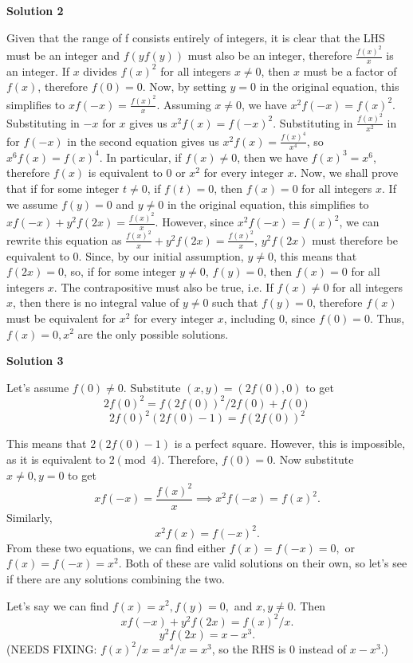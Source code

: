 \begin{enumerate}
 



\textbf{Solution 2}

Given that the range of f consists entirely of integers, it is clear that the LHS must be an integer and $f(yf(y))$ must also be an integer, therefore $\frac{f(x)^2}{x}$ is an integer. If $x$ divides $f(x)^2$ for all integers $x \ne 0$, then $x$ must be a factor of $f(x)$, therefore $f(0)=0$. Now, by setting $y=0$ in the original equation, this simplifies to $xf(-x)=\frac{f(x)^2}{x}$. Assuming $x \ne 0$, we have $x^2f(-x)=f(x)^2$. Substituting in $-x$ for $x$ gives us $x^2f(x)=f(-x)^2$. Substituting in $\frac{f(x)^2}{x^2}$ in for $f(-x)$ in the second equation gives us $x^2f(x)=\frac{f(x)^4}{x^4}$, so $x^6f(x)=f(x)^4$. In particular, if $f(x) \ne 0$, then we have $f(x)^3=x^6$, therefore $f(x)$ is equivalent to $0$ or $x^2$ for every integer $x$. Now, we shall prove that if for some integer $t \ne 0$, if $f(t)=0$, then $f(x)=0$ for all integers $x$. If we assume $f(y)=0$ and $y \ne 0$ in the original equation, this simplifies to $xf(-x)+y^2f(2x)=\frac{f(x)^2}{x}$. However, since $x^2f(-x)=f(x)^2$, we can rewrite this equation as $\frac{f(x)^2}{x}+y^2f(2x)=\frac{f(x)^2}{x}$, $y^2f(2x)$ must therefore be equivalent to $0$. Since, by our initial assumption, $y \ne 0$, this means that $f(2x)=0$, so, if for some integer $y \ne 0$, $f(y)=0$, then $f(x)=0$ for all integers $x$. The contrapositive must also be true, i.e. If $f(x) \ne 0$ for all integers $x$, then there is no integral value of $y \ne 0$ such that $f(y)=0$, therefore $f(x)$ must be equivalent for $x^2$ for every integer $x$, including $0$, since $f(0)=0$. Thus, $f(x)=0, x^2$ are the only possible solutions.

 



\textbf{Solution 3}

Let's assume $f(0)\neq 0.$ Substitute $(x,y)=(2f(0),0)$ to get 
 \[2f(0)^2=f(2f(0))^2/2f(0)+f(0)\]
 \[2f(0)^2(2f(0)-1)=f(2f(0))^2\]

 This means that $2(2f(0)-1)$ is a perfect square. However, this is impossible, as it is equivalent to $2\pmod{4}.$ Therefore, $f(0)=0.$ Now substitute $x\neq 0, y=0$ to get 
 \[xf(-x)=\frac{f(x)^2}{x} \implies x^2f(-x)=f(x)^2.\]Similarly, 
 \[x^2f(x)=f(-x)^2.\]From these two equations, we can find either $f(x)=f(-x)=0,$ or $f(x)=f(-x)=x^2.$ Both of these are valid solutions on their own, so let's see if there are any solutions combining the two. 

 Let's say we can find $f(x)=x^2, f(y)=0,$ and $x,y\neq 0.$ Then 
 \[xf(-x)+y^2f(2x)=f(x)^2/x.\]
 \[y^2f(2x)=x-x^3.\] (NEEDS FIXING: $f(x)^2/x= x^4/x = x^3$, so the RHS is $0$ instead of $x-x^3$.)


\end{enumerate}
